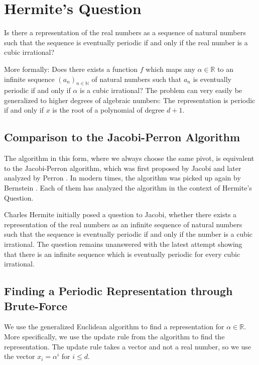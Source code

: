 \chapter{Hermite's Question}

\begin{problem}
  Is there a representation of the real numbers as a sequence of natural
  numbers such that the sequence is eventually periodic if and only if the real
  number is a cubic irrational?
\end{problem}

More formally: Does there exists a function $f$ which maps any $α ∈ ℝ$ to an
infinite sequence $(a_n)_{n ∈ ℕ}$ of natural numbers such that $a_n$ is
eventually periodic if and only if $α$ is a cubic irrational?
The problem can very easily be generalized to higher degrees of algebraic numbers:
The representation is periodic if and only if $x$ is the root of a polynomial of degree $d + 1$.

\section{Comparison to the Jacobi-Perron Algorithm}

The algorithm in this form, where we always choose the same pivot,
is equivalent to the Jacobi-Perron algorithm, which was first proposed
by Jacobi \cite{Jacobi68} and later analyzed by Perron \cite{Perron07}.
In modern times, the algorithm was picked up again by Bernstein \cite{Bernstein06}.
Each of them has analyzed the algorithm in the context of Hermite's Question.

Charles Hermite initially posed a question to Jacobi, whether there exists a
representation of the real numbers as an infinite sequence of natural numbers
such that the sequence is eventually periodic if and only if the number is a
cubic irrational. The question remains unanswered with the latest attempt
\cite{Murru15} showing that there is an infinite sequence which is eventually
periodic for every cubic irrational.

\section{Finding a Periodic Representation through Brute-Force}

We use the generalized Euclidean algorithm to find a representation for $α ∈ ℝ$.
More specifically, we use the update rule from the algorithm to find the representation.
The update rule takes a vector and not a real number, so we use the vector $x_i = α^i$ for $i ≤ d$.

